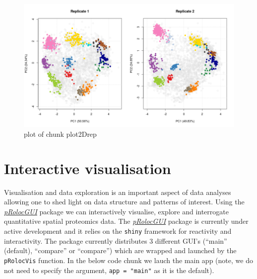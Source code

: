 \begin{figure}[htbp]
\centering
\includegraphics{figure/plot2Drep-1.png}
\caption{plot of chunk plot2Drep}
\end{figure}

\section{Interactive visualisation}\label{interactive-visualisation}

Visualisation and data exploration is an important aspect of data
analyses allowing one to shed light on data structure and patterns of
interest. Using the
\emph{\href{http://bioconductor.org/packages/pRolocGUI}{pRolocGUI}}
package we can interactively visualise, explore and interrogate
quantitative spatial proteomics data. The
\emph{\href{http://bioconductor.org/packages/pRolocGUI}{pRolocGUI}}
package is currently under active development and it relies on the
\texttt{shiny} framework for reactivity and interactivity. The package
currently distributes 3 different GUI's (``main'' (default), ``compare''
or ``compare'') which are wrapped and launched by the \texttt{pRolocVis}
function. In the below code chunk we lauch the main app (note, we do not
need to specify the argument, \texttt{app = "main"} as it is the
default).

\begin{Shaded}
\begin{Highlighting}[]
\NormalTok{(}\NormalTok{)}
\end{Highlighting}
\end{Shaded}


